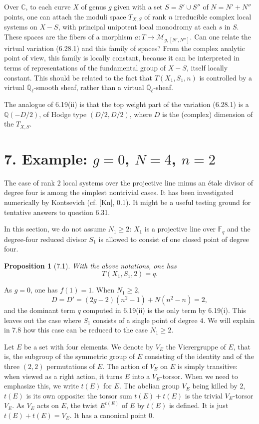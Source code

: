 \documentclass[10pt]{article}
\newcommand{\Fq}{\mathbb F_q}
\newcommand{\Ql}{\overline{\mathbb Q}_{\ell}}
\newcommand{\C}{\mathbb C}
\newcommand{\Q}{\mathbb Q}
\theoremstyle{deligne}
\newtheorem*{proposition*}{Proposition}
\newcommand{\heading}[1]{\vspace{0.7em}\noindent{\bfseries #1}\quad}
\begin{document}
Over $\C$, to each curve $X$ of genus $g$ given with a set $S=S'\cup S''$ of $N=N'+N''$ points, one can attach the moduli space $T_{X,S}$ of rank $n$ irreducible complex local systems on $X-S$, with principal unipotent local monodromy at each $s$ in $S$. These spaces are the fibers of a morphism $a:T\to\mathcal M_{g,[N',N'']}$. Can one relate the virtual variation (6.28.1) and this family of spaces? From the complex analytic point of view, this family is locally constant, because it can be interpreted in terms of representations of the fundamental group of $X-S$, itself locally constant. This should be related to the fact that $T(X_1,S_1,n)$ is controlled by a virtual $\Ql$-smooth sheaf, rather than a virtual $\Ql$-sheaf.

The analogue of 6.19(ii) is that the top weight part of the variation (6.28.1) is a $\Q(-D/2)$, of Hodge type $(D/2,D/2)$, where $D$ is the (complex) dimension of the $T_{X,S}$.

\section*{7. Example: $g=0$, $N=4$, $n=2$}

The case of rank $2$ local systems over the projective line minus an \'{e}tale divisor of degree four is among the simplest nontrivial cases. It has been investigated numerically by Kontsevich (cf. [Kn], 0.1). It might be a useful testing ground for tentative answers to question 6.31.

In this section, we do not assume $N_1\ge2$: $X_1$ is a projective line over $\Fq$ and the degree-four reduced divisor $S_1$ is allowed to consist of one closed point of degree four.

\begin{proposition*}[7.1]
With the above notations, one has
\begin{equation}\tag{7.1.1}
T(X_1,S_1,2)=q.
\end{equation}
\end{proposition*}

As $g=0$, one has $f(1)=1$. When $N_1\ge2$,
\[
D=D'=(2g-2)(n^2-1)+N(n^2-n)=2,
\]
and the dominant term $q$ computed in 6.19(ii) is the only term by 6.19(i). This leaves out the case where $S_1$ consists of a single point of degree $4$. We will explain in 7.8 how this case can be reduced to the case $N_1\ge2$.

\heading{7.2.} Let $E$ be a set with four elements. We denote by $V_E$ the Vierergruppe of $E$, that is, the subgroup of the symmetric group of $E$ consisting of the identity and of the three $(2,2)$ permutations of $E$. The action of $V_E$ on $E$ is simply transitive: when viewed as a right action, it turns $E$ into a $V_E$-torsor. When we need to emphasize this, we write $t(E)$ for $E$. The abelian group $V_E$ being killed by $2$, $t(E)$ is its own opposite: the torsor sum $t(E)+t(E)$ is the trivial $V_E$-torsor $V_E$. As $V_E$ acts on $E$, the twist $E^{t(E)}$ of $E$ by $t(E)$ is defined. It is just $t(E)+t(E)=V_E$. It has a canonical point $0$.
\end{document}
